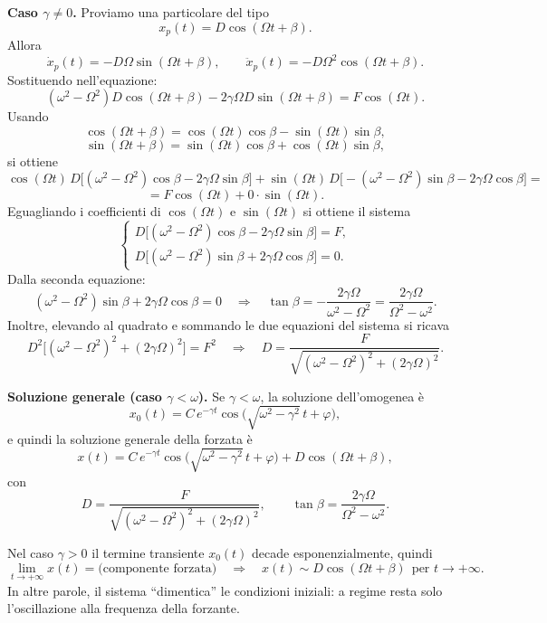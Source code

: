 \medskip
\textbf{Caso \(\gamma\neq 0\).}
Proviamo una particolare del tipo
\[
x_p(t)=D\cos(\Omega t+\beta).
\]
Allora
\[
\dot{x}_p(t)=-D\Omega\sin(\Omega t+\beta),
\qquad
\ddot{x}_p(t)=-D\Omega^2\cos(\Omega t+\beta).
\]
Sostituendo nell’equazione:
\[
(\omega^2-\Omega^2)D\cos(\Omega t+\beta)-2\gamma\Omega D\sin(\Omega t+\beta)=F\cos(\Omega t).
\]
Usando
\[
\cos(\Omega t+\beta)=\cos(\Omega t)\cos\beta-\sin(\Omega t)\sin\beta,
\]
\[
\sin(\Omega t+\beta)=\sin(\Omega t)\cos\beta+\cos(\Omega t)\sin\beta,
\]
si ottiene
\[
\cos(\Omega t)\,D\bigl[(\omega^2-\Omega^2)\cos\beta-2\gamma\Omega\sin\beta\bigr]
+\sin(\Omega t)\,D\bigl[-(\omega^2-\Omega^2)\sin\beta-2\gamma\Omega\cos\beta\bigr] =
\]
\[
=F\cos(\Omega t)+0\cdot\sin(\Omega t).
\]
Eguagliando i coefficienti di \(\cos(\Omega t)\) e \(\sin(\Omega t)\) si ottiene il sistema
\[
\begin{cases}
D\bigl[(\omega^2-\Omega^2)\cos\beta-2\gamma\Omega\sin\beta\bigr]=F,\\[4pt]
D\bigl[(\omega^2-\Omega^2)\sin\beta+2\gamma\Omega\cos\beta\bigr]=0.
\end{cases}
\]
Dalla seconda equazione:
\[
(\omega^2-\Omega^2)\sin\beta+2\gamma\Omega\cos\beta=0
\quad\Rightarrow\quad
\tan\beta=-\dfrac{2\gamma\Omega}{\omega^2-\Omega^2}
=\dfrac{2\gamma\Omega}{\Omega^2-\omega^2}.
\]
Inoltre, elevando al quadrato e sommando le due equazioni del sistema si ricava
\[
D^2\bigl[(\omega^2-\Omega^2)^2+(2\gamma\Omega)^2\bigr]=F^2
\quad\Rightarrow\quad
D=\frac{F}{\sqrt{(\omega^2-\Omega^2)^2+(2\gamma\Omega)^2}}.
\]

\medskip
\textbf{Soluzione generale (caso \(\gamma<\omega\)).}
Se \(\gamma<\omega\), la soluzione dell’omogenea è
\[
x_0(t)=C\,e^{-\gamma t}\cos\!\bigl(\sqrt{\omega^2-\gamma^2}\,t+\varphi\bigr),
\]
e quindi la soluzione generale della forzata è
\[
x(t)=C\,e^{-\gamma t}\cos\!\bigl(\sqrt{\omega^2-\gamma^2}\,t+\varphi\bigr)
+ D\cos(\Omega t+\beta),
\]
con
\[
D=\frac{F}{\sqrt{(\omega^2-\Omega^2)^2+(2\gamma\Omega)^2}},
\qquad
\tan\beta=\frac{2\gamma\Omega}{\Omega^2-\omega^2}.
\]

\begin{oss}{}
Nel caso \(\gamma>0\) il termine transiente \(x_0(t)\) decade esponenzialmente, quindi
\[
\lim_{t\to+\infty} x(t) = \text{(componente forzata)} \quad\Rightarrow\quad
x(t)\sim D\cos(\Omega t+\beta)\ \ \text{per } t\to+\infty.
\]
In altre parole, il sistema “dimentica” le condizioni iniziali: a regime resta solo l’oscillazione alla frequenza della forzante.
\end{oss}
